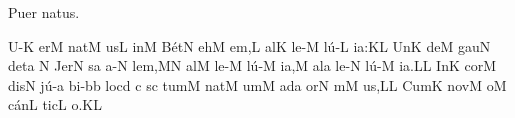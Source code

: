 
\beginhymn Puer natus.


\Internote
\nosolesmescustos
\initiumgregorianum
{}%
\sgn {}U-\punctum K\egn
\sgn {}er\punctum M\egn
\spatium
\sgn n{a}t\punctum M\egn
\sgn {}us\punctum L\egn
\spatium
\sgn {}in\punctum M\egn
\spatium
\sgn B{\'e}t\punctum N\egn
{}eh\punctum M\egn
\sgn {}e{m,}\punctum L\egn
\spatium
\sgn {}al\punctum K\egn
\sgn le-\punctum M\egn
\sgn l{\'u}-\punctum L\egn
\sgn ia:\punctum K\augmentum L\egn
\spatium
\divisiominor
\spatium
\sgn {}Un\punctum K\egn
\sgn de{}\punctum M\egn
\spatium
\sgn g{a}u\punctum N\egn
\sgn det\punctum a\egn
\spatium
\custos N
\lineaproxima
\sgn Jer\punctum N\egn
{}s\punctum a\egn
\sgn {}a-\punctum N\egn
\sgn le{m,}\punctum M\augmentum N\egn
\spatium
\divisiominor
\spatium
\sgn {}al\punctum M\egn
\sgn le-\punctum M\egn
\sgn l{\'u}-\punctum M\egn
\sgn ia,\punctum M\egn
\spatium
\sgn {}al\punctum a\egn
\sgn le-\punctum N\egn
\sgn l{\'u}-\punctum M\egn
\sgn ia.\punctum L\augmentum L\egn
\spatium
\divisiofinalis
\spatium
{}In\punctum K\egn
\spatium
\sgn c{o}r\punctum M\egn
\sgn dis\punctum N\egn
\spatium
\sgn j{\'u}-\punctum a\egn
\sgn bi-\bmolle b\punctum b\egn
\sgn lo{}\punctum c\augmentum d\egn
\spatium
\divisiominima
\spatium
\custos c
\lineaproxima
{}s\punctum c\egn
\sgn tum\punctum M\egn
\spatium
\sgn n{a}t\punctum M\egn
\sgn {}um\punctum M\egn
\spatium
\sgn {}ad\punctum a\egn
\sgn {}or\punctum N\egn
{}m\punctum M\egn
\sgn {}u{s,}\punctum L\augmentum L\egn
\spatium
\divisiominor
\spatium
\sgn Cum\punctum K\egn
\spatium
\sgn n{o}v\punctum M\egn
\sgn {}o{}\punctum M\egn
\spatium
\sgn c{\'a}n\punctum L\egn
\sgn tic\punctum L\egn
\sgn {}o.\punctum K\augmentum L\egn
\spatium
\Finisgregoriana

\bigskip

\beginlyrics

